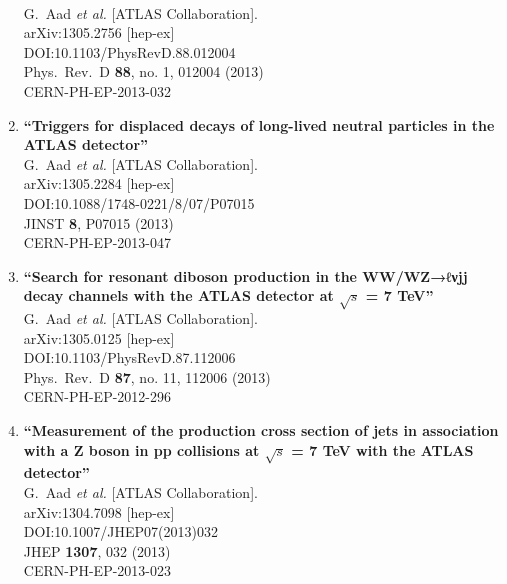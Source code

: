 \documentclass{article}
\begin{document}
\begin{enumerate}
  \\{}G.~Aad {\it et al.} [ATLAS Collaboration].
  \\{}arXiv:1305.2756 [hep-ex]
  \\{}DOI:10.1103/PhysRevD.88.012004
  \\{}Phys.\ Rev.\ D {\bf 88}, no. 1, 012004 (2013)
  \\{}CERN-PH-EP-2013-032
\item%
{\bf ``Triggers for displaced decays of long-lived neutral particles in the ATLAS detector''}
  \\{}G.~Aad {\it et al.} [ATLAS Collaboration].
  \\{}arXiv:1305.2284 [hep-ex]
  \\{}DOI:10.1088/1748-0221/8/07/P07015
  \\{}JINST {\bf 8}, P07015 (2013)
  \\{}CERN-PH-EP-2013-047
\item%
{\bf ``Search for resonant diboson production in the WW/WZ→ℓνjj decay channels with the ATLAS detector at $\sqrt{s}$ = 7  TeV''}
  \\{}G.~Aad {\it et al.} [ATLAS Collaboration].
  \\{}arXiv:1305.0125 [hep-ex]
  \\{}DOI:10.1103/PhysRevD.87.112006
  \\{}Phys.\ Rev.\ D {\bf 87}, no. 11, 112006 (2013)
  \\{}CERN-PH-EP-2012-296
\item%
{\bf ``Measurement of the production cross section of jets in association with a Z boson in pp collisions at $\sqrt{s}$ = 7 TeV with the ATLAS detector''}
  \\{}G.~Aad {\it et al.} [ATLAS Collaboration].
  \\{}arXiv:1304.7098 [hep-ex]
  \\{}DOI:10.1007/JHEP07(2013)032
  \\{}JHEP {\bf 1307}, 032 (2013)
  \\{}CERN-PH-EP-2013-023

\end{enumerate}
\end{document}

